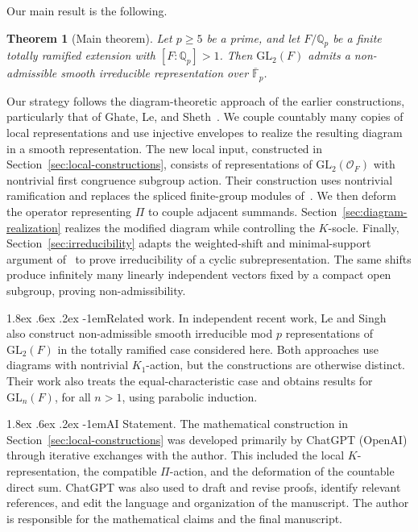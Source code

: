 \documentclass[10pt]{article}
\makeatletter
\renewcommand\paragraph{\@startsection{paragraph}{4}{\z@}%
  {1.8ex \@plus .6ex \@minus .2ex}%
  {-1em}{\normalfont\normalsize\bfseries}}
\theoremstyle{plain}
\newtheorem{theorem}{Theorem}[section]
\theoremstyle{definition}
\theoremstyle{remark}
\newcommand{\Qp}{\mathbb{Q}_p}
\newcommand{\Fpbar}{\overline{\mathbb{F}}_p}
\newcommand{\GL}{\mathrm{GL}}
\makeatother
\begin{document}
Our main result is the following.

\begin{theorem}[Main theorem]\label{thm:main}
Let $p\geq 5$ be a prime, and let $F/\Qp$ be a finite totally ramified extension with $[F:\Qp]>1$. Then $\GL_2(F)$ admits a non-admissible smooth irreducible representation over $\Fpbar$.
\end{theorem}

Our strategy follows the diagram-theoretic approach of the earlier constructions, particularly that of Ghate, Le, and Sheth~\cite{GLS23}. We couple countably many copies of local representations and use injective envelopes to realize the resulting diagram in a smooth representation. The new local input, constructed in Section~\ref{sec:local-constructions}, consists of representations of $\GL_2(\mathcal O_F)$ with nontrivial first congruence subgroup action. Their construction uses nontrivial ramification and replaces the spliced finite-group modules of~\cite{GLS23}. We then deform the operator representing $\Pi$ to couple adjacent summands. Section~\ref{sec:diagram-realization} realizes the modified diagram while controlling the $K$-socle. Finally, Section~\ref{sec:irreducibility} adapts the weighted-shift and minimal-support argument of~\cite[Proposition~3.1]{GLS23} to prove irreducibility of a cyclic subrepresentation. The same shifts produce infinitely many linearly independent vectors fixed by a compact open subgroup, proving non-admissibility.

\paragraph{Related work.}
In independent recent work, Le and Singh~\cite{LS26} also construct non-admissible smooth irreducible mod $p$ representations of $\GL_2(F)$ in the totally ramified case considered here. Both approaches use diagrams with nontrivial $K_1$-action, but the constructions are otherwise distinct. Their work also treats the equal-characteristic case and obtains results for $\GL_n(F)$, for all $n>1$, using parabolic induction.

\paragraph{AI Statement.}
The mathematical construction in Section~\ref{sec:local-constructions} was developed primarily by ChatGPT (OpenAI) through iterative exchanges with the author. This included the local $K$-representation, the compatible $\Pi$-action, and the deformation of the countable direct sum. ChatGPT was also used to draft and revise proofs, identify relevant references, and edit the language and organization of the manuscript. The author is responsible for the mathematical claims and the final manuscript.
\end{document}

